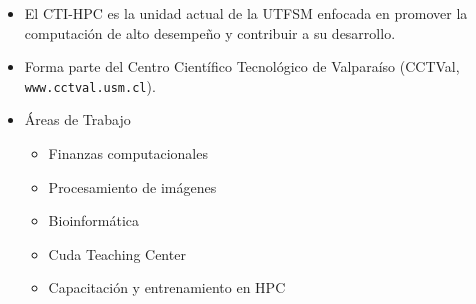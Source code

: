 \frame
{
\frametitle{}
        \begin{itemize}
	    \item El CTI-HPC es la unidad actual de la UTFSM enfocada en promover la computación de alto desempeño y contribuir a su desarrollo.
	    \item Forma parte del Centro Científico Tecnológico de Valparaíso (CCTVal, \texttt{www.cctval.usm.cl}).
	    \item Áreas de Trabajo	
		\begin{itemize}
		\item Finanzas computacionales
		\item Procesamiento de imágenes
		\item Bioinformática
		\item Cuda Teaching Center
		\item Capacitación y entrenamiento en HPC
		\end{itemize}
        \end{itemize}
}

